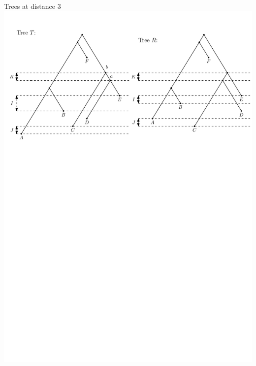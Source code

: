 \documentclass{beamer}
\theoremstyle{example}
\begin{document}
\begin{frame}
\begin{block}{Trees at distance $3$}
\includegraphics[width=\framewidth]{dts_neighbors}
\end{block}
\end{frame}
\end{document}
